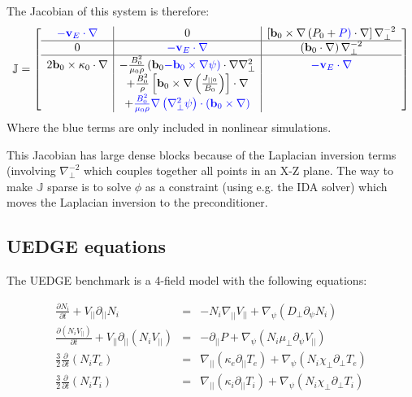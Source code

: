 \documentclass[12pt]{article}
\newcommand{\deriv}[2]{\ensuremath{\frac{\partial #1}{\partial #2}}}
\newcommand{\Vpar}{\ensuremath{V_{||}}}
\newcommand{\Vec}[1]{\ensuremath{\mathbf{#1}}}
\newcommand{\bvec}{\Vec{b}}
\newcommand{\kvec}{\Vec{\kappa}}
\newcommand{\vvec}{\Vec{v}}
\newcommand{\bxk}{\bvec_0\times\kvec_0\cdot\nabla}
\newcommand{\delp}{\nabla_\perp^2}
\newcommand{\Jac}{\ensuremath{\mathbb{J}}}
\begin{document}
The Jacobian of this system is therefore:
\begin{equation}
\mathbb{J} = 
\left[ \begin{array}{c|c|c}
\color{blue}{-\vvec_E\cdot\nabla} & 0 & \left[\bvec_0\times\nabla\left(P_0 + \color{blue}{P}\right)\cdot\nabla\right]\nabla_\perp^{-2} \\
\hline
0 & \color{blue}{-\vvec_E\cdot\nabla} & \left(\bvec_0\cdot\nabla\right)\nabla_\perp^{-2}  \\
\hline
2\bxk  & -\frac{B_0^2}{\mu_0\rho}\left(\bvec_0 \color{blue}{-\bvec_0\times\nabla\psi}\right)\cdot\nabla\delp  & \color{blue}{-\vvec_E\cdot\nabla} \\
 & + \frac{B_0^2}{\rho}\left[\bvec_0\times\nabla\left(\frac{J_{||0}}{B_0}\right)\right]\cdot\nabla & \\
 & + \color{blue}{\frac{B_0^2}{\mu_0\rho}\nabla\left(\delp\psi\right)\cdot\left(\bvec_0\times\nabla\right)} & 
\end{array}\right]
\label{eq:mhdjacobian}
\end{equation}
Where the blue terms are only included in nonlinear simulations.

This Jacobian has large dense blocks because of the Laplacian inversion terms
(involving $\nabla_\perp^{-2}$ which couples together all points in an
X-Z plane. The way to make $\Jac$ sparse is to solve $\phi$ as a constraint
(using e.g. the IDA solver) which moves the Laplacian inversion to the
preconditioner.


\subsection{UEDGE equations}

The UEDGE benchmark is a 4-field model with the following equations:

\begin{eqnarray*}
\deriv{N_i}{t} + \Vpar\partial_{||}N_i &=& -N_i\nabla_{||}\Vpar +\nabla_\psi\left(D_\perp \partial_\psi N_i\right) \\
\deriv{\left(N_i\Vpar\right)}{t} + \Vpar\partial_{||}\left(N_i\Vpar\right) &=& -\partial_{||}P + \nabla_\psi\left(N_i\mu_\perp\partial_\psi\Vpar\right) \\
\frac{3}{2}\deriv{}{t}\left(N_iT_e\right) &=& \nabla_{||}\left(\kappa_e\partial_{||}T_e\right) + \nabla_\psi\left(N_i\chi_\perp\partial_\perp T_e\right) \\
\frac{3}{2}\deriv{}{t}\left(N_iT_i\right) &=& \nabla_{||}\left(\kappa_i\partial_{||}T_i\right) + \nabla_\psi\left(N_i\chi_\perp\partial_\perp T_i\right)
\end{eqnarray*}
\end{document}
